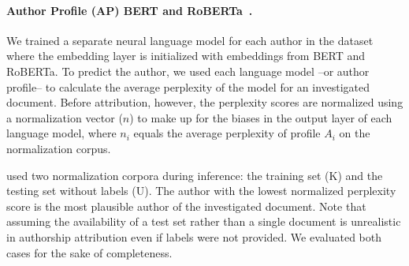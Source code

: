 \documentclass[11pt]{article}
\begin{document}
\paragraph{Author Profile (AP) BERT and RoBERTa~\citep{Barlas2020,Barlas2021}.} 
We trained a separate neural language model for each author in the dataset where the embedding layer is initialized with embeddings from BERT and RoBERTa. To predict the author, we used each language model --or author profile-- to calculate the average perplexity of the model for an investigated document. Before attribution, however, the perplexity scores are normalized using a normalization vector ($n$) to make up for the biases in the output layer of each language model, where $n_i$ equals the average perplexity of profile $A_i$ on the normalization corpus.

\citet{Barlas2020,Barlas2021} used two normalization corpora during inference: the training set (K) and the testing set without labels (U). The author with the lowest normalized perplexity score is the most plausible author of the investigated document. Note that assuming the availability of a test set rather than a single document is unrealistic in authorship attribution even if labels were not provided. We evaluated both cases for the sake of completeness.  
\end{document}
